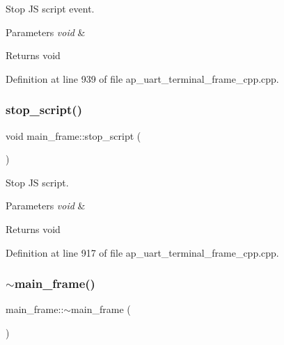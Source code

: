 Stop JS script event. 


\begin{DoxyParams}{Parameters}
{\em void} & \\
\hline
\end{DoxyParams}
\begin{DoxyReturn}{Returns}
void 
\end{DoxyReturn}


Definition at line 939 of file ap\+\_\+uart\+\_\+terminal\+\_\+frame\+\_\+cpp.\+cpp.

\mbox{\label{group___u_a_r_t__terminal_ga2a7532491f152197d2ce67b4c40a573c}} 
\subsubsection{stop\_script()}
{\footnotesize\ttfamily void main\+\_\+frame\+::stop\+\_\+script (\begin{DoxyParamCaption}\item[{void}]{ }\end{DoxyParamCaption})}



Stop JS script. 


\begin{DoxyParams}{Parameters}
{\em void} & \\
\hline
\end{DoxyParams}
\begin{DoxyReturn}{Returns}
void 
\end{DoxyReturn}


Definition at line 917 of file ap\+\_\+uart\+\_\+terminal\+\_\+frame\+\_\+cpp.\+cpp.

\mbox{\label{group___u_a_r_t__terminal_gac90714016e56999e76bfee3f50063f5c}} 
\subsubsection{$\sim$main\_frame()}
{\footnotesize\ttfamily main\+\_\+frame\+::$\sim$main\+\_\+frame (\begin{DoxyParamCaption}{ }\end{DoxyParamCaption})\hspace{0.3cm}{\ttfamily [virtual]}}



